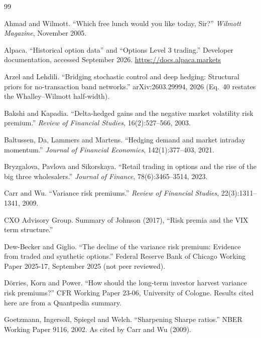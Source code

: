 \documentclass[10pt, a4paper, twocolumn]{article}
\begin{document}
\begin{thebibliography}{99}
\footnotesize

Ahmad and Wilmott.
\newblock ``Which free lunch would you like today, Sir?''
\newblock \textit{Wilmott Magazine}, November 2005.

Alpaca.
\newblock ``Historical option data'' and ``Options Level 3 trading.''
\newblock Developer documentation, accessed September 2026. \url{https://docs.alpaca.markets}

Arzel and Lehdili.
\newblock ``Bridging stochastic control and deep hedging: Structural priors for no-transaction band networks.''
\newblock arXiv:2603.29994, 2026 (Eq.~40 restates the Whalley--Wilmott half-width).

Bakshi and Kapadia.
\newblock ``Delta-hedged gains and the negative market volatility risk premium.''
\newblock \textit{Review of Financial Studies}, 16(2):527--566, 2003.

Baltussen, Da, Lammers and Martens.
\newblock ``Hedging demand and market intraday momentum.''
\newblock \textit{Journal of Financial Economics}, 142(1):377--403, 2021.

Bryzgalova, Pavlova and Sikorskaya.
\newblock ``Retail trading in options and the rise of the big three wholesalers.''
\newblock \textit{Journal of Finance}, 78(6):3465--3514, 2023.

Carr and Wu.
\newblock ``Variance risk premiums.''
\newblock \textit{Review of Financial Studies}, 22(3):1311--1341, 2009.

CXO Advisory Group.
\newblock Summary of Johnson (2017), ``Risk premia and the VIX term structure.''

Dew-Becker and Giglio.
\newblock ``The decline of the variance risk premium: Evidence from traded and synthetic options.''
\newblock Federal Reserve Bank of Chicago Working Paper 2025-17, September 2025 (not peer reviewed).

D\"orries, Korn and Power.
\newblock ``How should the long-term investor harvest variance risk premiums?''
\newblock CFR Working Paper 23-06, University of Cologne. Results cited here are from a Quantpedia summary.

Goetzmann, Ingersoll, Spiegel and Welch.
\newblock ``Sharpening Sharpe ratios.''
\newblock NBER Working Paper 9116, 2002. As cited by Carr and Wu (2009).


\end{thebibliography}
\end{document}
